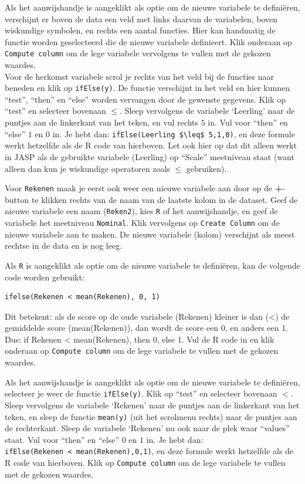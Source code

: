 \documentclass[
]{book}
\begin{document}
Als het aanwijshandje is aangeklikt als optie om de nieuwe variabele te definiëren, verschijnt er boven de data een veld met links daarvan de variabelen, boven wiskundige symbolen, en rechts een aantal functies. Hier kan handmatig de functie worden geselecteerd die de nieuwe variabele definieert. Klik onderaan op \texttt{Compute\ column} om de lege variabele vervolgens te vullen met de gekozen waardes.\\
Voor de herkomst variabele scrol je rechts van het veld bij de functies naar beneden en klik op \texttt{ifElse(y)}. De functie verschijnt in het veld en hier kunnen ``test'', ``then'' en ``else'' worden vervangen door de gewenste gegevens. Klik op ``test'' en selecteer bovenaan \(\leq\). Sleep vervolgens de variabele `Leerling' naar de puntjes aan de linkerkant van het teken, en vul rechts \(5\) in. Vul voor ``then'' en ``else'' \(1\) en \(0\) in. Je hebt dan: \texttt{ifElse(Leerling\ \$\textbackslash{}leq\$\ 5,1,0)}, en deze formule werkt hetzelfde als de R code van hierboven. Let ook hier op dat dit alleen werkt in JASP als de gebruikte variabele (Leerling) op ``Scale'' meetniveau staat (want alleen dan kun je wiskundige operatoren zoals \(\leq\) gebruiken).

Voor \texttt{Rekenen} maak je eerst ook weer een nieuwe variabele aan door op de \textbf{+}-button te klikken rechts van de naam van de laatste kolom in de dataset. Geef de nieuwe variabele een naam (\texttt{Reken2}), kies \texttt{R} of het aanwijshandje, en geef de variabele het meetniveau \texttt{Nominal}. Klik vervolgens op \texttt{Create\ Column} om de nieuwe variabele aan te maken. De nieuwe variabele (kolom) verschijnt als meest rechtse in de data en is nog leeg.

Als \texttt{R} is aangeklikt als optie om de nieuwe variabele te definiëren, kan de volgende code worden gebruikt:

\begin{verbatim}
ifelse(Rekenen < mean(Rekenen), 0, 1)
\end{verbatim}

Dit betekent: als de score op de oude variabele (Rekenen) kleiner is dan (\textless) de gemiddelde score (mean(Rekenen)), dan wordt de score een 0, en anders een 1. Dus: if Rekenen \textless{} mean(Rekenen), then 0, else 1. Vul de R code in en klik onderaan op \texttt{Compute\ column} om de lege variabele te vullen met de gekozen waardes.

Als het aanwijshandje is aangeklikt als optie om de nieuwe variabele te definiëren, selecteer je weer de functie \texttt{ifElse(y)}. Klik op ``test'' en selecteer bovenaan \(<\). Sleep vervolgens de variabele `Rekenen' naar de puntjes aan de linkerkant van het teken, en sleep de functie \texttt{mean(y)} (uit het scrolmenu rechts) naar de puntjes aan de rechterkant. Sleep de variabele `Rekenen' nu ook naar de plek waar ``values'' staat. Vul voor ``then'' en ``else'' \(0\) en \(1\) in. Je hebt dan: \texttt{ifElse(Rekenen\ \textless{}\ mean(Rekenen),0,1)}, en deze formule werkt hetzelfde als de R code van hierboven. Klik op \texttt{Compute\ column} om de lege variabele te vullen met de gekozen waardes.
\end{document}
